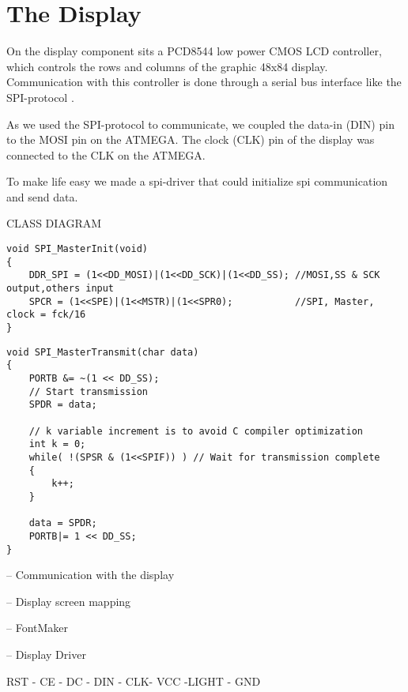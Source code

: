 \section{The Display}
On the display component sits a PCD8544 low power CMOS LCD controller, which controls the rows and columns of the graphic 48x84 display. Communication with this controller is done through a serial bus interface like the SPI-protocol \cite{NokiaDisplay}.

As we used the SPI-protocol to communicate, we coupled the data-in (DIN) pin to the MOSI pin on the ATMEGA. The clock (CLK) pin of the display was connected to the CLK on the ATMEGA. 

To make life easy we made a spi-driver that could initialize spi communication and send data.

CLASS DIAGRAM 

\begin{lstlisting}
void SPI_MasterInit(void)
{	
	DDR_SPI = (1<<DD_MOSI)|(1<<DD_SCK)|(1<<DD_SS); //MOSI,SS & SCK output,others input
	SPCR = (1<<SPE)|(1<<MSTR)|(1<<SPR0);  		   //SPI, Master, clock = fck/16
}
\end{lstlisting}


\begin{lstlisting}
void SPI_MasterTransmit(char data)
{
	PORTB &= ~(1 << DD_SS);
	// Start transmission
	SPDR = data;			
	
	// k variable increment is to avoid C compiler optimization
	int k = 0;
	while( !(SPSR & (1<<SPIF)) ) // Wait for transmission complete
	{
		k++;
	}			
	
	data = SPDR;
	PORTB|= 1 << DD_SS;
}
\end{lstlisting}

-- Communication with the display

-- Display screen mapping

-- FontMaker 

-- Display Driver

RST - CE - DC - DIN - CLK- VCC -LIGHT - GND
